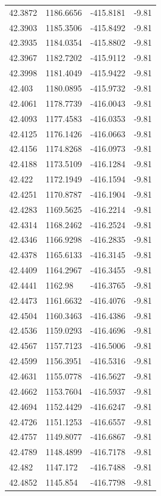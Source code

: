 \begin{table}[H]
\begin{tabular}{llll}
42.3872 & 1186.6656 & -415.8181 & -9.81 \\
42.3903 & 1185.3506 & -415.8492 & -9.81 \\
42.3935 & 1184.0354 & -415.8802 & -9.81 \\
42.3967 & 1182.7202 & -415.9112 & -9.81 \\
42.3998 & 1181.4049 & -415.9422 & -9.81 \\
42.403 & 1180.0895 & -415.9732 & -9.81 \\
42.4061 & 1178.7739 & -416.0043 & -9.81 \\
42.4093 & 1177.4583 & -416.0353 & -9.81 \\
42.4125 & 1176.1426 & -416.0663 & -9.81 \\
42.4156 & 1174.8268 & -416.0973 & -9.81 \\
42.4188 & 1173.5109 & -416.1284 & -9.81 \\
42.422 & 1172.1949 & -416.1594 & -9.81 \\
42.4251 & 1170.8787 & -416.1904 & -9.81 \\
42.4283 & 1169.5625 & -416.2214 & -9.81 \\
42.4314 & 1168.2462 & -416.2524 & -9.81 \\
42.4346 & 1166.9298 & -416.2835 & -9.81 \\
42.4378 & 1165.6133 & -416.3145 & -9.81 \\
42.4409 & 1164.2967 & -416.3455 & -9.81 \\
42.4441 & 1162.98 & -416.3765 & -9.81 \\
42.4473 & 1161.6632 & -416.4076 & -9.81 \\
42.4504 & 1160.3463 & -416.4386 & -9.81 \\
42.4536 & 1159.0293 & -416.4696 & -9.81 \\
42.4567 & 1157.7123 & -416.5006 & -9.81 \\
42.4599 & 1156.3951 & -416.5316 & -9.81 \\
42.4631 & 1155.0778 & -416.5627 & -9.81 \\
42.4662 & 1153.7604 & -416.5937 & -9.81 \\
42.4694 & 1152.4429 & -416.6247 & -9.81 \\
42.4726 & 1151.1253 & -416.6557 & -9.81 \\
42.4757 & 1149.8077 & -416.6867 & -9.81 \\
42.4789 & 1148.4899 & -416.7178 & -9.81 \\
42.482 & 1147.172 & -416.7488 & -9.81 \\
42.4852 & 1145.854 & -416.7798 & -9.81 \\

\end{tabular}
\end{table}
